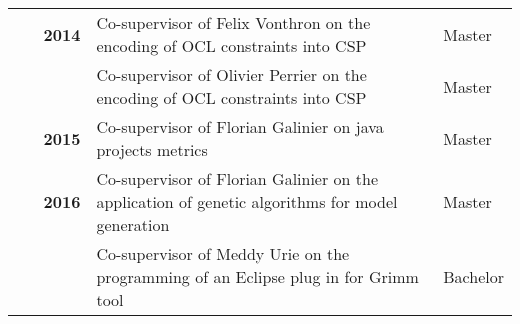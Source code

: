 \documentclass{article} %
\begin{document}







\begin{tabular}{r @{~~$\rangle$~} p{} l}

\textbf{~~~2014} & Co-supervisor of Felix Vonthron on the encoding of OCL constraints into CSP & Master \\
                 & Co-supervisor of Olivier Perrier on the encoding of OCL constraints into CSP & Master \\

\textbf{2015} & Co-supervisor of Florian Galinier on java projects metrics & Master \\
            
          
\textbf{2016} & Co-supervisor of Florian Galinier on the application of genetic algorithms for model generation & Master \\
              & Co-supervisor of Meddy Urie on the programming of an Eclipse plug in for Grimm tool & Bachelor \\
\end{tabular}


\end{document}
